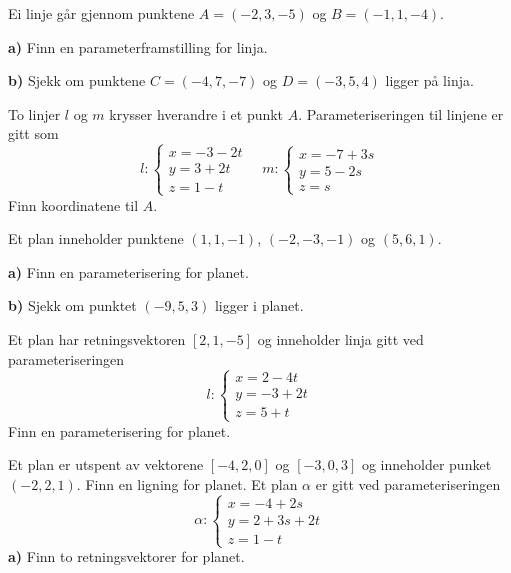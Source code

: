 




	
\opgt

Ei linje går gjennom punktene $ A=(-2, 3, -5) $ og $ B=(-1, 1, -4) $.\os

\textbf{a)}	Finn en parameterframstilling for linja.\os

\textbf{b)} Sjekk om punktene $ C=(-4, 7, -7) $ og $ D=(-3, 5, 4) $ ligger på linja.

To linjer $ l $ og $ m $ krysser hverandre i et punkt $ A $. Parameteriseringen til linjene er gitt som
\[l: \left\lbrace{
	\begin{array}{l}
	x=-3-2t  \\
	y= 3+ 2t   \\
	z= 1-t 
	\end{array}
}\right. \quad 
m: \left\lbrace{
	\begin{array}{l}
	x=-7 +3s  \\
	y= 5- 2s   \\
	z= s 
	\end{array}
}\right. \]
Finn koordinatene til $ A $.

Et plan inneholder punktene $ (1, 1,-1) $, $ (-2, -3, -1) $ og $ (5, 6, 1) $. \os

\textbf{a)} Finn en parameterisering for planet.\os

\textbf{b)} Sjekk om punktet $ (-9, 5, 3) $ ligger i planet.


Et plan har retningsvektoren $ [2, 1, -5] $ og inneholder linja gitt ved parameteriseringen
\[ l: \left\lbrace{
	\begin{array}{l}
	x=2-4t  \\
	y= -3+ 2t   \\
	z= 5+t 
	\end{array}
}\right. \]
Finn en parameterisering for planet.


\nes
{}
Et plan er utspent av vektorene $ [-4, 2, 0] $ og $ [-3, 0, 3] $ og inneholder punket $ (-2, 2, 1) $. Finn en ligning for planet.
\newpage
{}
Et plan $ \alpha $ er gitt ved parameteriseringen
\[\alpha: \left\lbrace{
	\begin{array}{l}
	x=-4 + 2s  \\
	y= 2+ 3s + 2t   \\
	z= 1-t 
	\end{array}
}\right. \]
\textbf{a)} Finn to retningsvektorer for planet.\os

